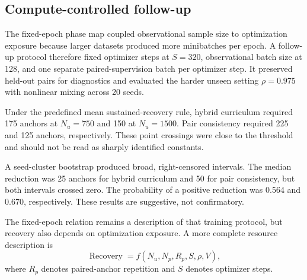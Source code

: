 \subsection{Compute-controlled follow-up}
The fixed-epoch phase map coupled observational sample size to optimization exposure because larger datasets produced more minibatches per epoch. A follow-up protocol therefore fixed optimizer steps at $S=320$, observational batch size at 128, and one separate paired-supervision batch per optimizer step. It preserved held-out pairs for diagnostics and evaluated the harder unseen setting $\rho=0.975$ with nonlinear mixing across 20 seeds.

Under the predefined mean sustained-recovery rule, hybrid curriculum required 175 anchors at $N_u=750$ and 150 at $N_u=1500$. Pair consistency required 225 and 125 anchors, respectively. These point crossings were close to the threshold and should not be read as sharply identified constants.

A seed-cluster bootstrap produced broad, right-censored intervals. The median reduction was 25 anchors for hybrid curriculum and 50 for pair consistency, but both intervals crossed zero. The probability of a positive reduction was 0.564 and 0.670, respectively. These results are suggestive, not confirmatory.

The fixed-epoch relation remains a description of that training protocol, but recovery also depends on optimization exposure. A more complete resource description is
\begin{equation}
  \operatorname{Recovery}=f(N_u,N_p,R_p,S,\rho,V),
\end{equation}
where $R_p$ denotes paired-anchor repetition and $S$ denotes optimizer steps.
